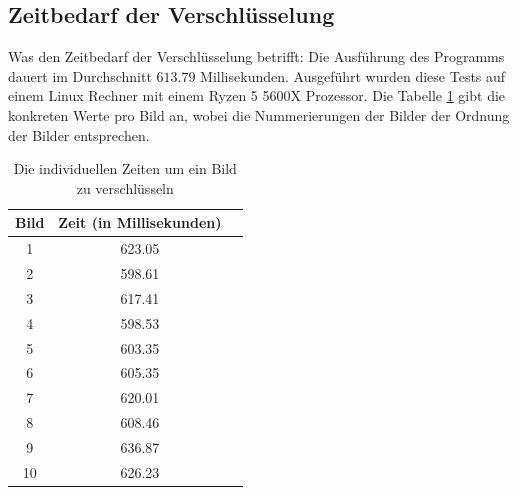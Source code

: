 \subsection{Zeitbedarf der Verschlüsselung}
Was den Zeitbedarf der Verschlüsselung betrifft: Die Ausführung des Programms dauert im Durchschnitt
$613.79$ Millisekunden. Ausgeführt wurden diese Tests auf einem Linux Rechner mit einem Ryzen 5 5600X Prozessor.
Die Tabelle \ref{tab:speed3} gibt die konkreten Werte pro Bild an, wobei die Nummerierungen der Bilder
der Ordnung der Bilder entsprechen.
\begin{table}
	\begin{center}
		\begin{tabular}{ |c|c|c| } 
		\hline
		Bild & Zeit (in Millisekunden) \\
		\hline
		1 & 623.05 \\
		2 & 598.61 \\
		3 & 617.41\\
		4 & 598.53\\
		5 & 603.35\\
		6 & 605.35\\
		7 & 620.01\\
		8 & 608.46\\
		9 & 636.87\\
		10 & 626.23\\
		\hline
		\end{tabular}
	\end{center}
	\caption{Die individuellen Zeiten um ein Bild zu verschlüsseln}
	\label{tab:speed3}
\end{table}


